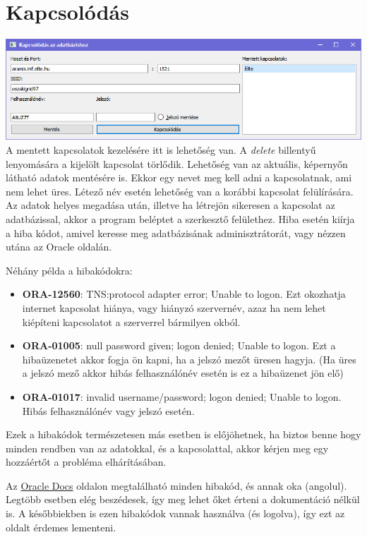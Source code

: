 \documentclass{elteikthesis}
\begin{document}
\section{Kapcsolódás}
\includegraphics[width=1.0\textwidth]{Connect}
A mentett kapcsolatok kezelésére itt is lehetőség van. A \textit{delete} billentyű lenyomására a kijelölt kapcsolat törlődik.
Lehetőség van az aktuális, képernyőn látható adatok mentésére is. Ekkor egy nevet meg kell adni a kapcsolatnak, ami nem lehet üres.
Létező név esetén lehetőség van a korábbi kapcsolat felülírására.
Az adatok helyes megadása után, illetve ha létrejön sikeresen a kapcsolat az adatbázissal, akkor a program beléptet a szerkesztő felülethez.
Hiba esetén kiírja a hiba kódot, amivel keresse meg adatbázisának adminisztrátorát, vagy nézzen utána az Oracle oldalán.

Néhány példa a hibakódokra:
\begin{itemize}
  \item \textbf{ORA-12560}: TNS:protocol adapter error; Unable to logon. Ezt okozhatja internet kapcsolat hiánya,
  vagy hiányzó szervernév, azaz ha nem lehet kiépíteni kapcsolatot a szerverrel bármilyen okból.
  \item \textbf{ORA-01005}: null password given; logon denied; Unable to logon. Ezt a hibaüzenetet akkor fogja ön kapni,
  ha a jelszó mezőt üresen hagyja. (Ha üres a jelszó mező akkor hibás felhasználónév esetén is ez a hibaüzenet jön elő)
  \item \textbf{ORA-01017}: invalid username/password; logon denied; Unable to logon. Hibás felhasználónév vagy jelszó esetén.
\end{itemize}

Ezek a hibakódok természetesen más esetben is előjöhetnek, ha biztos benne hogy minden rendben van az adatokkal, és a
kapcsolattal, akkor kérjen meg egy hozzáértőt a probléma elhárításában.

Az \href{https://docs.oracle.com/cd/B28359_01/server.111/b28278/toc.htm}{Oracle Docs} oldalon megtalálható minden hibakód, és annak oka (angolul).
Legtöbb esetben elég beszédesek, így meg lehet őket érteni a dokumentáció nélkül is.
A későbbiekben is ezen hibakódok vannak használva (és logolva), így ezt az oldalt érdemes lementeni.
\end{document}
